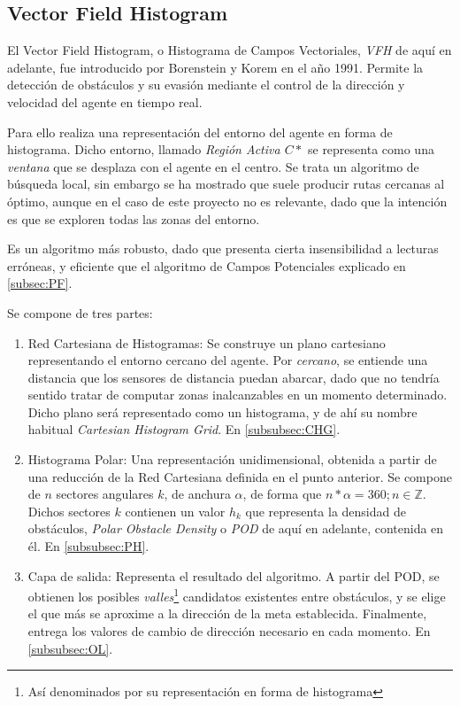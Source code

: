 \subsection{Vector Field Histogram}
\label{subsec:VFH}
El Vector Field Histogram, o Histograma de Campos Vectoriales, \textit{VFH} de aquí en adelante, fue introducido por Borenstein y Korem en el año 1991. Permite la detección de obstáculos y su evasión mediante el control de la dirección y velocidad del agente en tiempo 
real.

Para ello realiza una representación del entorno del agente en forma de histograma. Dicho entorno, llamado \textit{Región Activa $C*$} se representa como una \textit{ventana} que se desplaza con el agente en el centro. Se trata un algoritmo de búsqueda local, sin embargo se ha mostrado que suele producir rutas cercanas al óptimo, aunque en el caso de este proyecto no es relevante, dado que la intención es que se exploren todas las zonas del entorno.

Es un algoritmo más robusto, dado que presenta cierta insensibilidad a lecturas erróneas, y eficiente que el algoritmo de Campos Potenciales explicado en \ref{subsec:PF}. 

Se compone de tres partes: 
\begin{enumerate}
\item Red Cartesiana de Histogramas: Se construye un plano cartesiano representando el entorno cercano del agente. Por \textit{cercano}, se entiende una distancia que los sensores de distancia puedan abarcar, dado que no tendría sentido tratar de computar zonas inalcanzables en un momento determinado. Dicho plano será representado como un histograma, y de ahí su nombre habitual \textit{Cartesian Histogram Grid}. En \ref{subsubsec:CHG}.
\item Histograma Polar: Una representación unidimensional, obtenida a partir de una reducción de la Red Cartesiana definida en el punto anterior. Se compone de $n$ sectores angulares $k$, de anchura $\alpha$, de forma que $n * \alpha = 360; n \in \mathbb{Z}$. Dichos sectores $k$ contienen un valor $h_k$ que representa la densidad de obstáculos, \textit{Polar Obstacle Density} o \textit{POD} de aquí en adelante, contenida en él. En \ref{subsubsec:PH}.
\item Capa de salida: Representa el resultado del algoritmo. A partir del POD, se obtienen los posibles \textit{valles}\footnote{Así denominados por su representación en forma de histograma} candidatos existentes entre obstáculos, y se elige el que más se aproxime a la dirección de la meta establecida. Finalmente, entrega los valores de cambio de dirección necesario en cada momento. En \ref{subsubsec:OL}.
\end{enumerate}

